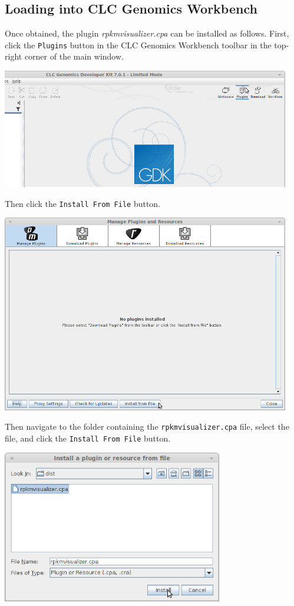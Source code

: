 \documentclass[12pt,letterpaper]{article}
\begin{document}
\subsection{Loading into CLC Genomics Workbench}

Once obtained, the plugin \textit{rpkmvisualizer.cpa} can be installed as
follows.  First, click the \texttt{Plugins} button in the CLC Genomics
Workbench toolbar in the top-right corner of the main window.

\begin{center}
    \includegraphics[width=34em]{plugins-button.png}
\end{center}

Then click the \texttt{Install From File} button.

\begin{center}
    \includegraphics[width=34em]{install-from-file-button.png}
\end{center}

Then navigate to the folder containing the \texttt{rpkmvisualizer.cpa} file,
select the file, and click the \texttt{Install From File} button.

\begin{center}
    \includegraphics[width=26em]{install-button.png}
\end{center}
\end{document}
